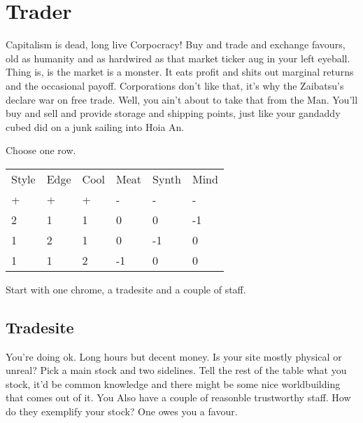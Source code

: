 \documentclass{tufte-book}
\begin{document}


\section{Trader} \label{sec:Trader}

Capitalism is dead, long live Corpocracy! Buy and trade and exchange favours, old as humanity and as hardwired as that market ticker aug in your left eyeball. Thing is, is the market is a monster. It eats profit and shits out marginal returns and the occasional payoff. Corporations don't like that, it's why the Zaibatsu's declare war on free trade. Well, you ain't about to take that from the Man. You'll buy and sell and provide storage and shipping points, just like your gandaddy cubed did on a junk sailing into Hoia An.


Choose one row.
\begin{table}[ht]
\centering
{}\selectfont
\begin{tabular}{llllll}
\toprule
Style & Edge & Cool & Meat & Synth & Mind\\
+&+&+&-&-&-\\
\midrule
2&1&1&0&0&-1\\
1&2&1&0&-1&0\\
1&1&2&-1&0&0\\
\bottomrule
\end{tabular}
\end{table}

Start with one chrome, a tradesite and a couple of staff.

\subsection{Tradesite}
You're doing ok. Long hours but decent money. Is your site mostly physical or unreal? Pick a main stock and two sidelines.
Tell the rest of the table what you stock, it'd be common knowledge and there might be some nice worldbuilding that comes out of it.
 You Also have a couple of reasonble trustworthy staff. How do they exemplify your stock? One owes you a favour.
\end{document}
